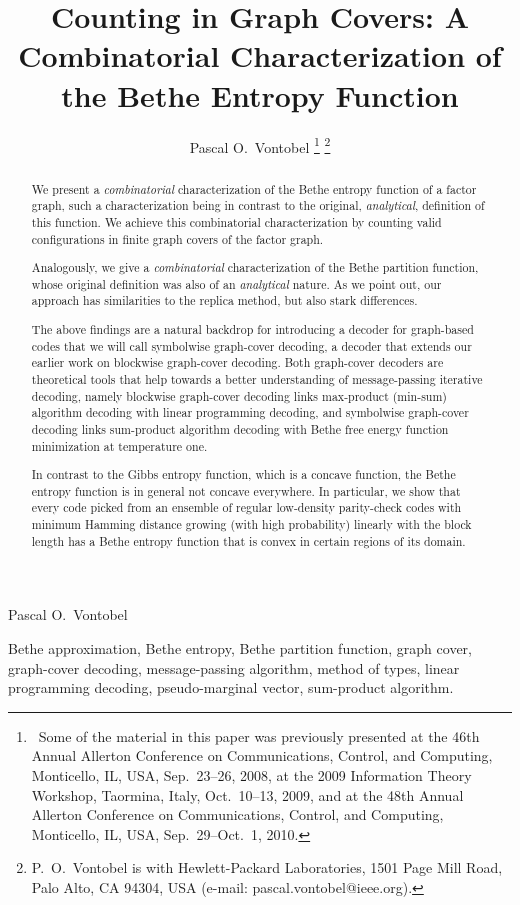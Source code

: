 \documentclass[journal, twocolumn]{IEEEtran}
\title{Counting in Graph Covers: 
       A Combinatorial Characterization of the
       Bethe Entropy Function}
\author{Pascal O.~Vontobel
        \thanks{\statusstring \ Some of the material in this paper 
          was previously presented
          at the 46th Annual Allerton Conference on Communications, Control,
          and Computing, Monticello, IL, USA, Sep.~23--26, 2008, 
          at the 2009 Information Theory Workshop, Taormina, Italy,
          Oct.~10--13, 2009,
          and at the 48th Annual Allerton Conference on Communications,
          Control, and Computing, Monticello, IL, USA, Sep.~29--Oct.~1,
          2010.}%
        \thanks{P.~O.~Vontobel is with Hewlett-Packard Laboratories, 1501 Page
          Mill Road, Palo Alto, CA 94304, USA
          (e-mail: pascal.vontobel@ieee.org).}%
      }
\newcommand{\?}{\mathrm{?}}
\begin{document}
%
         {Pascal O.~Vontobel}

\maketitle



\begin{abstract}
  We present a \emph{combinatorial} characterization of the Bethe entropy
  function of a factor graph, such a characterization being in contrast to the
  original, \emph{analytical}, definition of this function. We achieve this
  combinatorial characterization by counting valid configurations in finite
  graph covers of the factor graph.

  Analogously, we give a \emph{combinatorial} characterization of the Bethe
  partition function, whose original definition was also of an
  \emph{analytical} nature. As we point out, our approach has similarities to
  the replica method, but also stark differences.

  The above findings are a natural backdrop for introducing a decoder for
  graph-based codes that we will call symbolwise graph-cover decoding, a
  decoder that extends our earlier work on blockwise graph-cover
  decoding. Both graph-cover decoders are theoretical tools that help towards a
  better understanding of message-passing iterative decoding, namely blockwise
  graph-cover decoding links max-product (min-sum) algorithm decoding with
  linear programming decoding, and symbolwise graph-cover decoding links
  sum-product algorithm decoding with Bethe free energy function minimization
  at temperature one.

  In contrast to the Gibbs entropy function, which is a concave function, the
  Bethe entropy function is in general not concave everywhere. In particular,
  we show that every code picked from an ensemble of regular low-density
  parity-check codes with minimum Hamming distance growing (with high
  probability) linearly with the block length has a Bethe entropy function
  that is convex in certain regions of its domain.
\end{abstract}


\begin{IEEEkeywords}
  Bethe approximation,
  Bethe entropy,
  Bethe partition function,
  graph cover,
  graph-cover decoding,
  message-passing algorithm,
  method of types,
  linear programming decoding,
  pseudo-marginal vector,
  sum-product algorithm.
\end{IEEEkeywords}
\end{document}
